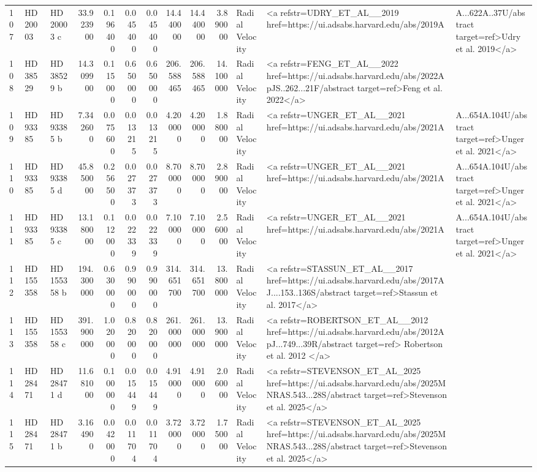 \begin{tabular}{lllrrrrrrrll}
107 & HD 20003 & HD 20003 c & 33.923900 & 0.196400 & 0.045400 & 0.045400 & 14.440000 & 14.440000 & 3.890000 & Radial Velocity & <a refstr=UDRY_ET_AL__2019 href=https://ui.adsabs.harvard.edu/abs/2019A&A...622A..37U/abstract target=ref>Udry et al. 2019</a> \\
108 & HD 38529 & HD 38529 b & 14.309900 & 0.115000 & 0.650000 & 0.650000 & 206.588465 & 206.588465 & 14.100000 & Radial Velocity & <a refstr=FENG_ET_AL__2022 href=https://ui.adsabs.harvard.edu/abs/2022ApJS..262...21F/abstract target=ref>Feng et al. 2022</a> \\
109 & HD 93385 & HD 93385 b & 7.342600 & 0.075600 & 0.013215 & 0.013215 & 4.200000 & 4.200000 & 1.880000 & Radial Velocity & <a refstr=UNGER_ET_AL__2021 href=https://ui.adsabs.harvard.edu/abs/2021A&A...654A.104U/abstract target=ref>Unger et al. 2021</a> \\
110 & HD 93385 & HD 93385 d & 45.850000 & 0.256500 & 0.027373 & 0.027373 & 8.700000 & 8.700000 & 2.890000 & Radial Velocity & <a refstr=UNGER_ET_AL__2021 href=https://ui.adsabs.harvard.edu/abs/2021A&A...654A.104U/abstract target=ref>Unger et al. 2021</a> \\
111 & HD 93385 & HD 93385 c & 13.180000 & 0.112000 & 0.022339 & 0.022339 & 7.100000 & 7.100000 & 2.560000 & Radial Velocity & <a refstr=UNGER_ET_AL__2021 href=https://ui.adsabs.harvard.edu/abs/2021A&A...654A.104U/abstract target=ref>Unger et al. 2021</a> \\
112 & HD 155358 & HD 155358 b & 194.300000 & 0.630000 & 0.990000 & 0.990000 & 314.651700 & 314.651700 & 13.800000 & Radial Velocity & <a refstr=STASSUN_ET_AL__2017 href=https://ui.adsabs.harvard.edu/abs/2017AJ....153..136S/abstract target=ref>Stassun et al. 2017</a> \\
113 & HD 155358 & HD 155358 c & 391.900000 & 1.020000 & 0.820000 & 0.820000 & 261.000000 & 261.000000 & 13.900000 & Radial Velocity & <a refstr=ROBERTSON_ET_AL__2012 href=https://ui.adsabs.harvard.edu/abs/2012ApJ...749...39R/abstract target=ref> Robertson et al. 2012 </a> \\
114 & HD 28471 & HD 28471 d & 11.681000 & 0.100000 & 0.015449 & 0.015449 & 4.910000 & 4.910000 & 2.060000 & Radial Velocity & <a refstr=STEVENSON_ET_AL_2025 href=https://ui.adsabs.harvard.edu/abs/2025MNRAS.543...28S/abstract target=ref>Stevenson et al. 2025</a> \\
115 & HD 28471 & HD 28471 b & 3.164900 & 0.042000 & 0.011704 & 0.011704 & 3.720000 & 3.720000 & 1.750000 & Radial Velocity & <a refstr=STEVENSON_ET_AL_2025 href=https://ui.adsabs.harvard.edu/abs/2025MNRAS.543...28S/abstract target=ref>Stevenson et al. 2025</a> \\

\end{tabular}
